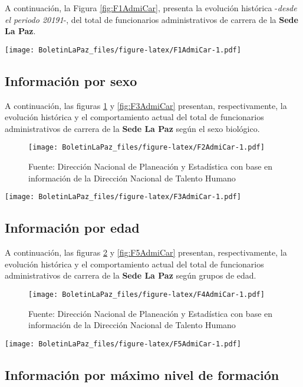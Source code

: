 \documentclass[
]{book}
\begin{document}
A continuación, la Figura \ref{fig:F1AdmiCar}, presenta la evolución histórica -\emph{desde el periodo 20191}-, del total de funcionarios administrativos de carrera de la \textbf{Sede La Paz}.

\texttt{[image: BoletinLaPaz\_files/figure-latex/F1AdmiCar-1.pdf]}

\hypertarget{informaciuxf3n-por-sexo-3}{%
\subsection{Información por sexo}\label{informaciuxf3n-por-sexo-3}}

A continuación, las figuras \ref{fig:F2AdmiCar} y \ref{fig:F3AdmiCar} presentan, respectivamente, la evolución histórica y el comportamiento actual del total de funcionarios administrativos de carrera de la \textbf{Sede La Paz} según el sexo biológico.

\begin{figure}
\centering
\texttt{[image: BoletinLaPaz\_files/figure-latex/F2AdmiCar-1.pdf]}
\caption{\label{fig:F2AdmiCar}Fuente: Dirección Nacional de Planeación y Estadística con base en información de la Dirección Nacional de Talento Humano}
\end{figure}

\texttt{[image: BoletinLaPaz\_files/figure-latex/F3AdmiCar-1.pdf]}

\hypertarget{informaciuxf3n-por-edad-3}{%
\subsection{Información por edad}\label{informaciuxf3n-por-edad-3}}

A continuación, las figuras \ref{fig:F4AdmiCar} y \ref{fig:F5AdmiCar} presentan, respectivamente, la evolución histórica y el comportamiento actual del total de funcionarios administrativos de carrera de la \textbf{Sede La Paz} según grupos de edad.

\begin{figure}
\centering
\texttt{[image: BoletinLaPaz\_files/figure-latex/F4AdmiCar-1.pdf]}
\caption{\label{fig:F4AdmiCar}Fuente: Dirección Nacional de Planeación y Estadística con base en información de la Dirección Nacional de Talento Humano}
\end{figure}

\texttt{[image: BoletinLaPaz\_files/figure-latex/F5AdmiCar-1.pdf]}

\hypertarget{informaciuxf3n-por-muxe1ximo-nivel-de-formaciuxf3n-1}{%
\subsection{Información por máximo nivel de formación}\label{informaciuxf3n-por-muxe1ximo-nivel-de-formaciuxf3n-1}}
\end{document}
